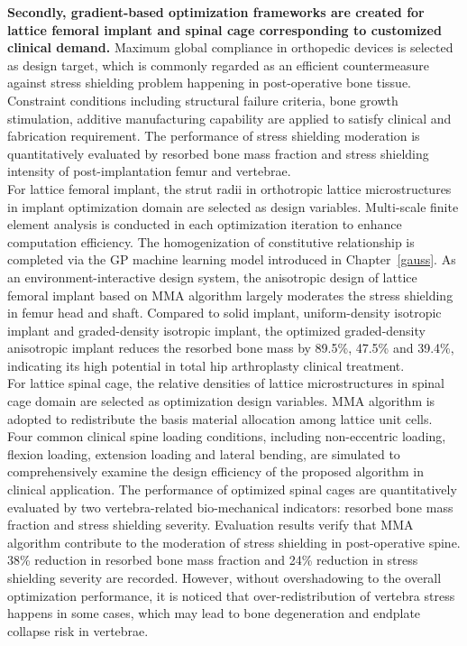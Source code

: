 \documentclass[12pt]{extbook}
\begin{document}
{\bf Secondly, gradient-based optimization frameworks are created for lattice femoral implant and spinal cage corresponding to customized clinical demand.} Maximum global compliance in orthopedic devices is selected as design target, which is commonly regarded as an efficient countermeasure against stress shielding problem happening in post-operative bone tissue. Constraint conditions including structural failure criteria, bone growth stimulation, additive manufacturing capability are applied to satisfy clinical and fabrication requirement. The performance of stress shielding moderation is quantitatively evaluated by resorbed bone mass fraction and stress shielding intensity of post-implantation femur and vertebrae.\\

For lattice femoral implant, the strut radii in orthotropic lattice microstructures in implant optimization domain are selected as design variables. Multi-scale finite element analysis is conducted in each optimization iteration to enhance computation efficiency. The homogenization of constitutive relationship is completed via the GP machine learning model introduced in Chapter~\ref{gauss}. As an environment-interactive design system, the anisotropic design of lattice femoral implant based on MMA algorithm largely moderates the stress shielding in femur head and shaft. Compared to solid implant, uniform-density isotropic implant and graded-density isotropic implant, the optimized graded-density anisotropic implant reduces the resorbed bone mass by 89.5\%, 47.5\% and 39.4\%, indicating its high potential in total hip arthroplasty clinical treatment.\\

For lattice spinal cage, the relative densities of lattice microstructures in spinal cage domain are selected as optimization design variables. MMA algorithm is adopted to redistribute the basis material allocation among lattice unit cells. Four common clinical spine loading conditions, including non-eccentric loading, flexion loading, extension loading and lateral bending, are simulated to comprehensively examine the design efficiency of the proposed algorithm in clinical application. The performance of optimized spinal cages are quantitatively evaluated by two vertebra-related bio-mechanical indicators: resorbed bone mass fraction and stress shielding severity. Evaluation results verify that MMA algorithm contribute to the moderation of stress shielding in post-operative spine. 38\% reduction in resorbed bone mass fraction and 24\% reduction in stress shielding severity are recorded. However, without overshadowing to the overall optimization performance, it is noticed that over-redistribution of vertebra stress happens in some cases, which may lead to bone degeneration and endplate collapse risk in vertebrae.\\
\end{document}

